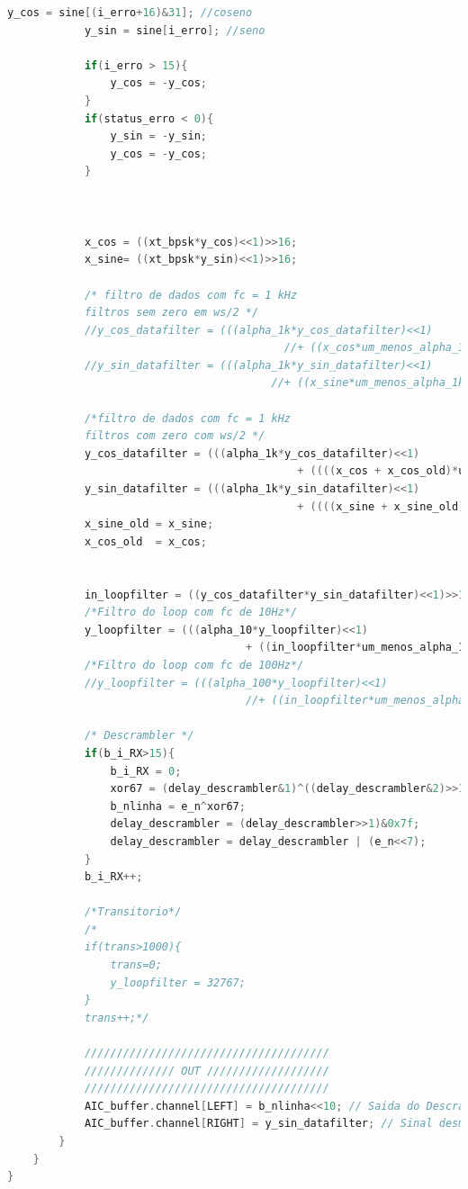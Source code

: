 \documentclass[11pt]{article}
\numberwithin{equation}{section}
\begin{document}
\begin{lstlisting}[language=C]
			y_cos = sine[(i_erro+16)&31]; //coseno
			y_sin = sine[i_erro]; //seno
			
			if(i_erro > 15){
				y_cos = -y_cos;
			}
			if(status_erro < 0){
				y_sin = -y_sin;
				y_cos = -y_cos;
			}
			
			
			
			x_cos = ((xt_bpsk*y_cos)<<1)>>16;
			x_sine= ((xt_bpsk*y_sin)<<1)>>16;
			
			/* filtro de dados com fc = 1 kHz
			filtros sem zero em ws/2 */
			//y_cos_datafilter = (((alpha_1k*y_cos_datafilter)<<1)  
										   //+ ((x_cos*um_menos_alpha_1k)<<1))>>16;
			//y_sin_datafilter = (((alpha_1k*y_sin_datafilter)<<1)  
									     //+ ((x_sine*um_menos_alpha_1k)<<1))>>16;
			
			/*filtro de dados com fc = 1 kHz
			filtros com zero com ws/2 */
			y_cos_datafilter = (((alpha_1k*y_cos_datafilter)<<1) 
											 + ((((x_cos + x_cos_old)*um_menos_alpha_1k)>>1)<<1))>>16;
			y_sin_datafilter = (((alpha_1k*y_sin_datafilter)<<1) 
											 + ((((x_sine + x_sine_old)*um_menos_alpha_1k)>>1)<<1))>>16;
			x_sine_old = x_sine;
			x_cos_old  = x_cos;
			
			
			in_loopfilter = ((y_cos_datafilter*y_sin_datafilter)<<1)>>16;
			/*Filtro do loop com fc de 10Hz*/
			y_loopfilter = (((alpha_10*y_loopfilter)<<1) 
									 + ((in_loopfilter*um_menos_alpha_10)<<1))>>16;
			/*Filtro do loop com fc de 100Hz*/
			//y_loopfilter = (((alpha_100*y_loopfilter)<<1) 
									 //+ ((in_loopfilter*um_menos_alpha_100)<<1))>>16;
			
			/* Descrambler */
			if(b_i_RX>15){
				b_i_RX = 0;
				xor67 = (delay_descrambler&1)^((delay_descrambler&2)>>1);
				b_nlinha = e_n^xor67;
				delay_descrambler = (delay_descrambler>>1)&0x7f;
				delay_descrambler = delay_descrambler | (e_n<<7);
			}
			b_i_RX++;
			
			/*Transitorio*/
			/*
			if(trans>1000){
				trans=0;
				y_loopfilter = 32767;
			}
			trans++;*/
			
			//////////////////////////////////////
			////////////// OUT ///////////////////
			//////////////////////////////////////
			AIC_buffer.channel[LEFT] = b_nlinha<<10; // Saida do Descrambler
			AIC_buffer.channel[RIGHT] = y_sin_datafilter; // Sinal desmodulado 
		}
	}
}
\end{lstlisting}
\end{document}
